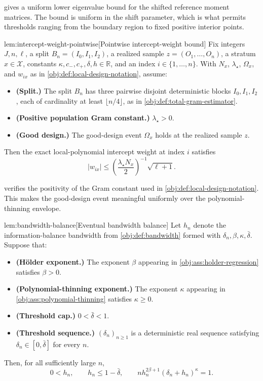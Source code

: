  gives a uniform lower eigenvalue bound for the shifted reference moment matrices. The bound is uniform in the shift parameter, which is what permits thresholds ranging from the boundary region to fixed positive interior points.

\begin{lemmav}{lem:intercept-weight-pointwise}[Pointwise intercept-weight bound]
Fix integers \(J,n,\ell\), a split \(B_n=(I_0,I_1,I_2)\), a realized sample \(z=(O_1,\ldots,O_n)\), a stratum \(x\in\mathcal X\), constants \(\kappa,c_-,c_+,\delta,h\in\mathbb R\), and an index \(i\in\{1,\ldots,n\}\).  With \(N_x\), \(\lambda_\star\), \(\Omega_x\), and \(w_{ix}\) as in \cref{obj:def:local-design-notation}, assume:
\begin{itemize}
\item \textbf{(Split.)} The split \(B_n\) has three pairwise disjoint deterministic blocks \(I_0,I_1,I_2\), each of cardinality at least \(\lfloor n/4\rfloor\), as in \cref{obj:def:total-gram-estimator}.
\item \textbf{(Positive population Gram constant.)} \(\lambda_\star>0\).
\item \textbf{(Good design.)} The good-design event \(\Omega_x\) holds at the realized sample \(z\).
\end{itemize}
Then the exact local-polynomial intercept weight at index \(i\) satisfies
\[
|w_{ix}|
\le
\left(\frac{\lambda_\star N_x}{2}\right)^{-1}\sqrt{\ell+1}.
\]
\end{lemmav}

 verifies the positivity of the Gram constant used in \cref{obj:def:local-design-notation}. This makes the good-design event meaningful uniformly over the polynomial-thinning envelope.

\begin{lemmav}{lem:bandwidth-balance}[Eventual bandwidth balance]
Let \(h_n\) denote the information-balance bandwidth from \cref{obj:def:bandwidth} formed with \(\delta_n,\beta,\kappa,\bar\delta\). Suppose that:
\begin{itemize}
\item \textbf{(Hölder exponent.)} The exponent \(\beta\) appearing in \cref{obj:ass:holder-regression} satisfies \(\beta>0\).
\item \textbf{(Polynomial-thinning exponent.)} The exponent \(\kappa\) appearing in \cref{obj:ass:polynomial-thinning} satisfies \(\kappa\geq0\).
\item \textbf{(Threshold cap.)} \(0<\bar\delta<1\).
\item \textbf{(Threshold sequence.)} \((\delta_n)_{n\geq1}\) is a deterministic real sequence satisfying \(\delta_n\in[0,\bar\delta]\) for every \(n\).
\end{itemize}
Then, for all sufficiently large \(n\),
\[
0<h_n,\qquad
h_n\leq 1-\bar\delta,\qquad
n h_n^{2\beta+1}(\delta_n+h_n)^\kappa=1.
\]
\end{lemmav}

